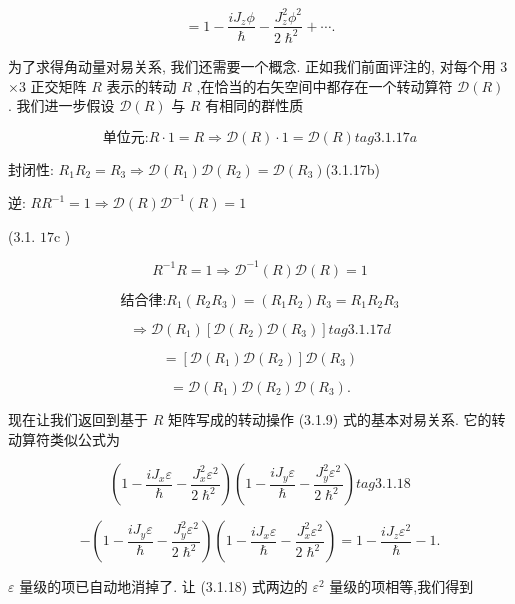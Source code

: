 $$
= 1 - \frac{i{J}_{z}\phi }{\hslash } - \frac{{J}_{z}^{2}{\phi }^{2}}{2{\hslash }^{2}} + \cdots .
$$

为了求得角动量对易关系, 我们还需要一个概念. 正如我们前面评注的, 对每个用 3 $\times 3$ 正交矩阵 $R$ 表示的转动 $R$ ,在恰当的右矢空间中都存在一个转动算符 $\mathcal{D}\left( R\right)$ . 我们进一步假设 $\mathcal{D}\left( R\right)$ 与 $R$ 有相同的群性质

$$
\text{单位元:}R \cdot 1 = R \Rightarrow \mathcal{D}\left( R\right) \cdot 1 = \mathcal{D}\left( R\right) tag{3.1.17a}
$$

封闭性: ${R}_{1}{R}_{2} = {R}_{3} \Rightarrow \mathcal{D}\left( {R}_{1}\right) \mathcal{D}\left( {R}_{2}\right) = \mathcal{D}\left( {R}_{3}\right)$(3.1.17b)

逆: $R{R}^{-1} = 1 \Rightarrow \mathcal{D}\left( R\right) {\mathcal{D}}^{-1}\left( R\right) = 1$

(3.1. ${17}\mathrm{c}$ )

$$
{R}^{-1}R = 1 \Rightarrow {\mathcal{D}}^{-1}\left( R\right) \mathcal{D}\left( R\right) = 1
$$

$$
\text{结合律:}{R}_{1}\left( {{R}_{2}{R}_{3}}\right) = \left( {{R}_{1}{R}_{2}}\right) {R}_{3} = {R}_{1}{R}_{2}{R}_{3}
$$

$$
\Rightarrow \mathcal{D}\left( {R}_{1}\right) \left\lbrack {\mathcal{D}\left( {R}_{2}\right) \mathcal{D}\left( {R}_{3}\right) }\right\rbrack tag{3.1.17d}
$$

$$
= \left\lbrack {\mathcal{D}\left( {R}_{1}\right) \mathcal{D}\left( {R}_{2}\right) }\right\rbrack \mathcal{D}\left( {R}_{3}\right)
$$

$$
= \mathcal{D}\left( {R}_{1}\right) \mathcal{D}\left( {R}_{2}\right) \mathcal{D}\left( {R}_{3}\right) .
$$

现在让我们返回到基于 $R$ 矩阵写成的转动操作 (3.1.9) 式的基本对易关系. 它的转动算符类似公式为

$$
\left( {1 - \frac{i{J}_{x}\varepsilon }{\hslash } - \frac{{J}_{x}^{2}{\varepsilon }^{2}}{2{\hslash }^{2}}}\right) \left( {1 - \frac{i{J}_{y}\varepsilon }{\hslash } - \frac{{J}_{y}^{2}{\varepsilon }^{2}}{2{\hslash }^{2}}}\right) tag{3. 1.18}
$$

$$
- \left( {1 - \frac{i{J}_{y}\varepsilon }{\hslash } - \frac{{J}_{y}^{2}{\varepsilon }^{2}}{2{\hslash }^{2}}}\right) \left( {1 - \frac{i{J}_{x}\varepsilon }{\hslash } - \frac{{J}_{x}^{2}{\varepsilon }^{2}}{2{\hslash }^{2}}}\right) = 1 - \frac{i{J}_{z}{\varepsilon }^{2}}{\hslash } - 1.
$$

$\varepsilon$ 量级的项已自动地消掉了. 让 (3.1.18) 式两边的 ${\varepsilon }^{2}$ 量级的项相等,我们得到

